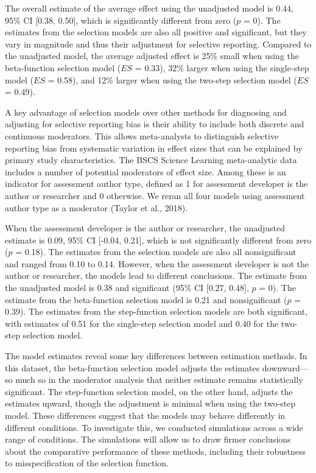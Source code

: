 \documentclass[
  american,
  man, donotrepeattitle,floatsintext]{apa7}
\begin{document}
The overall estimate of the average effect using the unadjusted model is 0.44, 95\% CI {[}0.38, 0.50{]}, which is significantly different from zero (\(p\) = 0). The estimates from the selection models are also all positive and significant, but they vary in magnitude and thus their adjustment for selective reporting. Compared to the unadjusted model, the average adjusted effect is 25\% small when using the beta-function selection model (\(ES\) = 0.33), 32\% larger when using the single-step model (\(ES\) = 0.58), and 12\% larger when using the two-step selection model (\(ES\) = 0.49).

A key advantage of selection models over other methods for diagnosing and adjusting for selective reporting bias is their ability to include both discrete and continuous moderators. This allows meta-analysts to distinguish selective reporting bias from systematic variation in effect sizes that can be explained by primary study characteristics. The BSCS Science Learning meta-analytic data includes a number of potential moderators of effect size. Among these is an indicator for assessment author type, defined as 1 for assessment developer is the author or researcher and 0 otherwise. We reran all four models using assessment author type as a moderator (Taylor et al., 2018).

When the assessment developer is the author or researcher, the unadjusted estimate is 0.09, 95\% CI {[}-0.04, 0.21{]}, which is not significantly different from zero (\(p\) = 0.18). The estimates from the selection models are also all nonsignificant and ranged from
0.10 to 0.14. However, when the assessment developer is not the author or researcher, the models lead to different conclusions. The estimate from the unadjusted model is 0.38 and significant (95\% CI {[}0.27, 0.48{]}, \(p\) = 0). The estimate from the beta-function selection model is 0.21 and nonsignificant (\(p\) = 0.39).
The estimates from the step-function selection models are both significant, with estimates of 0.51 for the single-step selection model and 0.40 for the two-step selection model.

The model estimates reveal some key differences between estimation methods. In this dataset, the beta-function selection model adjusts the estimates downward---so much so in the moderator analysis that neither estimate remains statistically significant. The step-function selection model, on the other hand, adjusts the estimates upward, though the adjustment is minimal when using the two-step model. These differences suggest that the models may behave differently in different conditions. To investigate this, we conducted simulations across a wide range of conditions. The simulations will allow us to draw firmer conclusions about the comparative performance of these methods, including their robustness to misspecification of the selection function.
\end{document}
